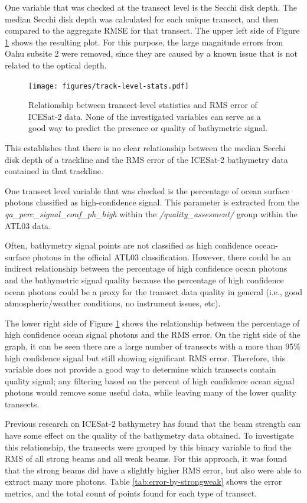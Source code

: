 One variable that was checked at the transect level is the Secchi disk depth. The median Secchi disk depth was calculated for each unique transect, and then compared to the aggregate RMSE for that transect. The upper left side of Figure \ref{fig:track-level-stats} shows the resulting plot. For this purpose, the large magnitude errors from Oahu subsite 2 were removed, since they are caused by a known issue that is not related to the optical depth.

\begin{figure}[!ht]
    \centering
    \texttt{[image: figures/track-level-stats.pdf]}
    \caption[Relationship between transect-level statistics and RMS error of ICESat-2 data]{Relationship between transect-level statistics and RMS error of ICESat-2 data. None of the investigated variables can serve as a good way to predict the presence or quality of bathymetric signal.}
    \label{fig:track-level-stats}
\end{figure}

This establishes that there is no clear relationship between the median Secchi disk depth of a trackline and the RMS error of the ICESat-2 bathymetry data contained in that trackline.

One transect level variable that was checked is the percentage of ocean surface photons classified as high-confidence signal. This parameter is extracted from the \emph{qa\_perc\_signal\_conf\_ph\_high} within the \emph{/quality\_assesment/} group within the ATL03 data.

Often, bathymetry signal points are not classified as high confidence ocean-surface photons in the official ATL03 classification. However, there could be an indirect relationship between the percentage of high confidence ocean photons and the bathymetric signal quality because the percentage of high confidence ocean photons could be a proxy for the transect data quality in general (i.e., good atmospheric/weather conditions, no instrument issues, etc).

The lower right side of Figure \ref{fig:track-level-stats} shows the relationship between the percentage of high confidence ocean signal photons and the RMS error. On the right side of the graph, it can be seen there are a large number of transects with a more than 95\% high confidence signal but still showing significant RMS error. Therefore, this variable does not provide a good way to determine which transects contain quality signal; any filtering based on the percent of high confidence ocean signal photons would remove some useful data, while leaving many of the lower quality transects.

Previous research on ICESat-2 bathymetry has found that the beam strength can have some effect on the quality of the bathymetry data obtained. To investigate this relationship, the transects were grouped by this binary variable to find the RMS of all strong beams and all weak beams. For this approach, it was found that the strong beams did have a slightly higher RMS error, but also were able to extract many more photons. Table \ref{tab:error-by-strongweak} shows the error metrics, and the total count of points found for each type of transect.




